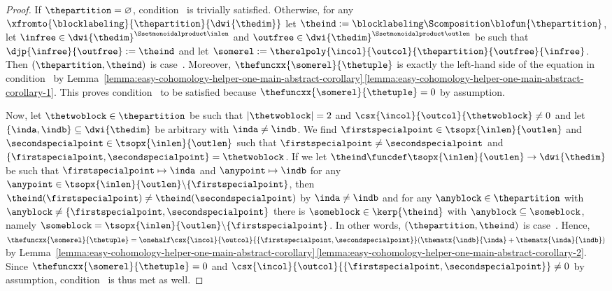 \documentclass[pdftex]{sigma}
\numberwithin{equation}{section}
\begin{document}
{\begin{proof}
                 If $\thepartition=\varnothing$, condition~\conditionone{} is trivially satisfied. Otherwise, for any $\xfromto{\blocklabeling}{\thepartition}{\dwi{\thedim}}$ let $\theind:= \blocklabeling\Scomposition \blofun{\thepartition}$, let $\infree\in\dwi{\thedim}^{\Ssetmonoidalproduct\inlen}$ and $\outfree\in\dwi{\thedim}^{\Ssetmonoidalproduct\outlen}$ be such that $\djp{\infree}{\outfree}:=\theind$ and  let $\somerel:= \therelpoly{\incol}{\outcol}{\thepartition}{\outfree}{\infree}$. Then $(\thepartition,\theind)$ is case~\scenarioone{}. Moreover, $\thefuncxx{\somerel}{\thetuple}$ is exactly the left-hand side of the equation in condition~\conditionone{} by Lem\-ma~\hyperref[lemma:easy-cohomology-helper-one-main-abstract-corollary-1]{\ref*{lemma:easy-cohomology-helper-one-main-abstract-corollary}\,\ref*{lemma:easy-cohomology-helper-one-main-abstract-corollary-1}}. This proves condition~\conditionone{} to be satisfied because $\thefuncxx{\somerel}{\thetuple}=0$ by assumption.

                                 Now, let $\thetwoblock\in\thepartition$ be such that $|\thetwoblock|=2$ and  $\csx{\incol}{\outcol}{\thetwoblock}\neq 0$ and let   $\{\inda,\indb\}\subseteq \dwi{\thedim}$ be arbitrary with $\inda\neq \indb$. We find $\firstspecialpoint\in\tsopx{\inlen}{\outlen}$ and $\secondspecialpoint\in\tsopx{\inlen}{\outlen}$ such that $\firstspecialpoint\neq \secondspecialpoint$ and  $\{\firstspecialpoint,\secondspecialpoint\}=\thetwoblock$. If we let $\theind\funcdef\tsopx{\inlen}{\outlen}\to\dwi{\thedim}$ be such that $\firstspecialpoint\mapsto \inda$ and  $\anypoint\mapsto \indb$ for any $\anypoint\in\tsopx{\inlen}{\outlen}\backslash\{\firstspecialpoint\}$, then   $\theind(\firstspecialpoint)\neq \theind(\secondspecialpoint)$ by $\inda\neq\indb$ and  for any $\anyblock\in\thepartition$ with $\anyblock\neq \{\firstspecialpoint,\secondspecialpoint\}$ there is $\someblock\in\kerp{\theind}$ with $\anyblock\subseteq\someblock$, namely $\someblock=\tsopx{\inlen}{\outlen}\backslash \{\firstspecialpoint\}$. In other words, $(\thepartition,\theind)$ is case~\scenariotwo{}. Hence, $\thefuncxx{\somerel}{\thetuple}=\onehalf\csx{\incol}{\outcol}{\{\firstspecialpoint,\secondspecialpoint\}}(\thematx{\indb}{\inda}+\thematx{\inda}{\indb})$ by  Lem\-ma~\hyperref[lemma:easy-cohomology-helper-one-main-abstract-corollary-2]{\ref*{lemma:easy-cohomology-helper-one-main-abstract-corollary}\,\ref*{lemma:easy-cohomology-helper-one-main-abstract-corollary-2}}. Since $\thefuncxx{\somerel}{\thetuple}=0$ and $\csx{\incol}{\outcol}{\{\firstspecialpoint,\secondspecialpoint\}}\neq 0$ by assumption, condition~\conditiontwo{} is thus met as well.


\end{proof}}
\end{document}
